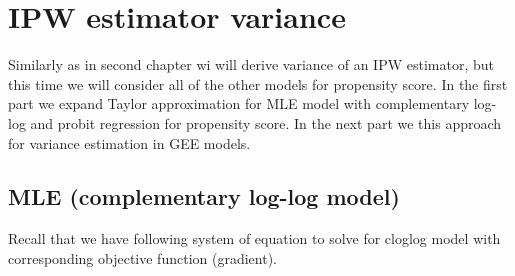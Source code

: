 \documentclass[
  letterpaper,
  DIV=11,
  numbers=noendperiod]{scrreprt}
\begin{document}
\[
\newcommand{\bSigma}{\boldsymbol{\Sigma}}
\newcommand{\bOmega}{\boldsymbol{\Omega}}
\newcommand{\bTheta}{\boldsymbol{\Theta}}
\newcommand{\bPi}{\boldsymbol{\Pi}}
\newcommand{\bbeta}{\boldsymbol{\beta}}
\newcommand{\balpha}{\boldsymbol{\alpha}}
\newcommand{\brho}{\boldsymbol{\rho}}
\newcommand{\beps}{\boldsymbol{\epsilon}}
\newcommand{\blambda}{\boldsymbol{\lambda}}
\newcommand{\bgamma}{\boldsymbol{\gamma}}
\newcommand{\btheta}{\boldsymbol{\theta}}
\newcommand{\bmu}{\boldsymbol{\mu}}
\newcommand{\bpi}{\boldsymbol{\pi}}
\newcommand{\bphi}{\boldsymbol{\phi}}
\newcommand{\bPhi}{\boldsymbol{\Phi}}
\newcommand{\boldeta}{\boldsymbol{\eta}}
\newcommand{\bx}{\boldsymbol{x}}
\newcommand{\bD}{\boldsymbol{D}}
\newcommand{\bV}{\boldsymbol{V}}
\newcommand{\bv}{\boldsymbol{v}}
\newcommand{\bY}{\boldsymbol{Y}}
\newcommand{\bA}{\boldsymbol{A}}
\newcommand{\bB}{\boldsymbol{B}}
\newcommand{\bR}{\boldsymbol{R}}
\newcommand{\bM}{\boldsymbol{M}}
\newcommand{\bI}{\boldsymbol{I}}
\newcommand{\bC}{\boldsymbol{C}}
\newcommand{\bW}{\boldsymbol{W}}
\newcommand{\bw}{\boldsymbol{w}}
\newcommand{\bd}{\boldsymbol{d}}
\newcommand{\bT}{\boldsymbol{T}}
\newcommand{\bt}{\boldsymbol{t}}
\newcommand{\bZ}{\boldsymbol{Z}}
\newcommand{\bX}{\boldsymbol{X}}
\newcommand{\bz}{\boldsymbol{z}}
\newcommand{\by}{\boldsymbol{y}}
\newcommand{\br}{\boldsymbol{r}}
\newcommand{\bp}{\boldsymbol{p}}
\newcommand{\bb}{\boldsymbol{b}}
\newcommand{\bZero}{\boldsymbol{0}}
\newcommand{\bOne}{\boldsymbol{1}}
\]

\hypertarget{ipw-estimator-variance}{%
\section{IPW estimator variance}\label{ipw-estimator-variance}}

Similarly as in second chapter wi will derive variance of an IPW
estimator, but this time we will consider all of the other models for
propensity score. In the first part we expand Taylor approximation for
MLE model with complementary log-log and probit regression for
propensity score. In the next part we this approach for variance
estimation in GEE models.

\hypertarget{mle-complementary-log-log-model}{%
\subsection{MLE (complementary log-log
model)}\label{mle-complementary-log-log-model}}

Recall that we have following system of equation to solve for cloglog
model with corresponding objective function (gradient).
\end{document}
